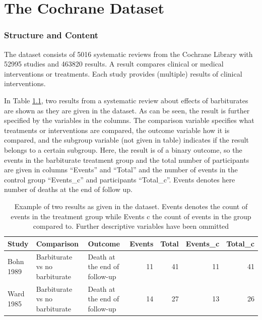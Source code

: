\documentclass[11pt,a4paper,twoside]{book}\usepackage[]{graphicx}\usepackage[]{color}
\begin{document}












\chapter{The Cochrane Dataset} 

\subsection{Structure and Content}
The dataset consists of 5016 systematic reviews from the Cochrane Library with 52995 studies and 463820 results. A result compares clinical or medical interventions or treatments. Each study provides (multiple) results of clinical interventions. 

In Table \ref{barbiturate.row}, two results from a systematic review about effects of barbiturates are shown as they are given in the dataset. As can be seen, the result is further specified by the variables in the columns. The comparison variable specifies what treatments or interventions are compared, the outcome variable how it is compared, and the subgroup variable (not given in table) indicates if the result belongs to a certain subgroup. Here, the result is of a binary outcome, so the events in the barbiturate treatment group and the total number of participants are given in columns ``Events'' and ``Total'' and the number of events in the control group ``Events\_c'' and participants ``Total\_c''. Events denotes here number of deaths at the end of follow up.

\begin{table}[ht]
\centering
\begingroup\scriptsize
\begin{tabular}{lllrrrr}
  \hline
Study & Comparison & Outcome & Events & Total & Events\_c & Total\_c \\ 
  \hline
Bohn 1989 & Barbiturate vs no barbiturate & Death at the end of follow-up & 11 & 41 & 11 & 41 \\ 
  Ward 1985 & Barbiturate vs no barbiturate & Death at the end of follow-up & 14 & 27 & 13 & 26 \\ 
   \hline
\end{tabular}
\endgroup
\caption{Example of two results as given in the dataset. Events denotes the count of events in the treatment group while Events c the count of events in the group compared to. Further descriptive variables have been ommitted} 
\label{barbiturate.row}
\end{table}
\end{document}
